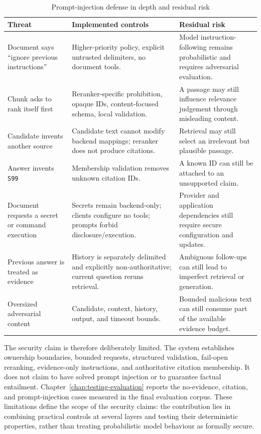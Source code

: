 \begin{table}[!htbp]
	\centering
	\caption{Prompt-injection defense in depth and residual risk}
	\label{tab:prompt-injection-controls}
	\small
	\begin{tabular}{@{}p{3.6cm}p{5.9cm}p{4.6cm}@{}}
		\toprule
		Threat & Implemented controls & Residual risk \\
		\midrule
		Document says ``ignore previous instructions'' & Higher-priority policy, explicit untrusted delimiters, no document tools. & Model instruction-following remains probabilistic and requires adversarial evaluation. \\
		Chunk asks to rank itself first & Reranker-specific prohibition, opaque IDs, content-focused schema, local validation. & A passage may still influence relevance judgement through misleading content. \\
		Candidate invents another source & Candidate text cannot modify backend mappings; reranker does not produce citations. & Retrieval may still select an irrelevant but plausible passage. \\
		Answer invents \texttt{S99} & Membership validation removes unknown citation IDs. & A known ID can still be attached to an unsupported claim. \\
		Document requests a secret or command execution & Secrets remain backend-only; clients configure no tools; prompts forbid disclosure/execution. & Provider and application dependencies still require secure configuration and updates. \\
		Previous answer is treated as evidence & History is separately delimited and explicitly non-authoritative; current question reruns retrieval. & Ambiguous follow-ups can still lead to imperfect retrieval or generation. \\
		Oversized adversarial content & Candidate, context, history, output, and timeout bounds. & Bounded malicious text can still consume part of the available evidence budget. \\
		\bottomrule
	\end{tabular}
\end{table}

The security claim is therefore deliberately limited. The system establishes ownership boundaries, bounded requests, structured validation, fail-open reranking, evidence-only instructions, and authoritative citation membership. It does not claim to have solved prompt injection or to guarantee factual entailment. Chapter~\ref{chap:testing-evaluation} reports the no-evidence, citation, and prompt-injection cases measured in the final evaluation corpus. These limitations define the scope of the security claims: the contribution lies in combining practical controls at several layers and testing their deterministic properties, rather than treating probabilistic model behaviour as formally secure.
